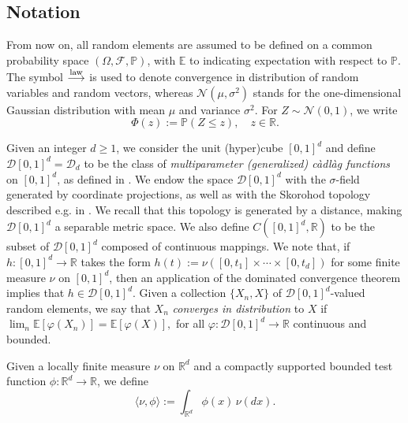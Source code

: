 \documentclass[11pt,a4paper]{article}
\newcommand\R{\mathbb{R}}
\numberwithin{equation}{section}
\theoremstyle{plain}
\theoremstyle{plain}
\theoremstyle{plain}
\theoremstyle{plain}
\theoremstyle{definition}
\theoremstyle{definition}
\begin{document}
\smallskip

\subsection{Notation}\label{ss:notation}

From now on, all random elements are assumed to be defined on a common probability space $(\Omega, \mathcal{F}, \mathbb{P})$, with $\mathbb{E}$ to indicating expectation with respect to $\mathbb{P}$. The symbol $\stackrel{\rm law}{\longrightarrow}$ is used to denote convergence in distribution of random variables and random vectors, whereas $\mathcal{N}(\mu, \sigma^2)$ stands for the one-dimensional Gaussian distribution with mean $\mu$ and variance $\sigma^2$. For $Z\sim\mathcal{N}(0,1)$, we write
\begin{equation}\label{e:Phi}
\Phi(z) := \mathbb{P}(Z\leq z), \quad z\in \R.
\end{equation}

\smallskip 

Given an integer $d\geq 1$, we consider the unit (hyper)cube $[0,1]^d$ and define $\mathcal{D}[0,1]^d = \mathcal{D}_d$ to be the class of {\it multiparameter (generalized) c\`adl\`ag functions} on $[0,1]^d$, as defined in \cite[Def. 1.1, p. 1286]{neuhaus}. We endow the space $\mathcal{D}[0,1]^d$ with the $\sigma$-field generated by coordinate projections, as well as with the Skorohod topology described e.g. in \cite[p.1289]{neuhaus}. We recall that this topology is generated by a distance, making $\mathcal{D}[0,1]^d$ a separable metric space. We also define $C([0,1]^d,\R)$ to be the subset of $\mathcal{D}[0,1]^d$ composed of continuous mappings. We note that, if $h:[0,1]^d\to \R$ takes the form $h(t):=\nu([0,t_1]\times\cdots\times [0,t_d])$ for some finite measure $\nu$ on $[0,1]^d$, then an application of the dominated convergence theorem implies that $h \in \mathcal{D}[0,1]^d$. Given a collection $\{X_n,X\} $ of $\mathcal{D}[0,1]^d$-valued random elements, we say that $X_n$ {\it converges in distribution} to $X$ if
$
\lim_n \mathbb{E}[\varphi(X_n)] =\mathbb{E}[\varphi(X)], 
$
for all $\varphi : \mathcal{D}[0,1]^d \to \R$ continuous and bounded. 
\smallskip

Given a locally finite measure $\nu$ on $\R^d$ and a compactly supported bounded test function $\phi : \R^d \to \R$, we define
\begin{equation}\label{e:action}
\langle \nu, \phi\rangle := \int_{\R^d} \phi(x) \, \nu(dx).
\end{equation}
\end{document}
